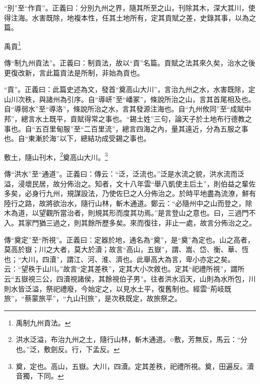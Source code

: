 {\noindent\shu{}\fzkt “別”至“作貢”。正義曰：分別九州之界，隨其所至之山，刊除其木，深大其川，使得注海。水害既除，地複本性，任其土地所有，定其貢賦之差，史錄其事，以為之篇。 \par}

禹貢\footnote{禹制九州貢法。}

{\noindent\zhuan{}\fzbyks 傳“制九州貢法”。正義曰：制貢法，故以“貢”名篇。貢賦之法其來久矣，治水之後更復改新，言此篇貢法是所制，非始為貢也。 \par}

{\noindent\shu{}\fzkt “貢”。正義曰：此篇史述為文，發首“奠高山大川”，言治九州之水，水害既除，定山川次秩，與諸州為引序。自“導岍”至“嶓冢”，條說所治之山，言其首尾相及也。自“導弱水”至“導洛”，條說所治之水，言其發源注海也。自“九州攸同”至“成賦中邦”，總言水土既平，貢賦得常之事也。“錫土姓”三句，論天子於土地布行德教之事也。自“五百里甸服”至“二百里流”，總言四海之內，量其遠近，分為五服之事也。自“東漸於海”以下，總結功成受錫之事也。 \par}

敷土，隨山刊木，\footnote{洪水泛溢，布治九州之土，隨行山林，斬木通道。○敷，芳無反，馬云：“分也。”泛，敷劍反。行，下孟反。}奠高山大川。\footnote{奠，定也。高山，五嶽。大川，四瀆。定其差秩，祀禮所視。奠，田遍反。瀆音獨，下同。}

{\noindent\zhuan{}\fzbyks 傳“洪水”至“通道”。正義曰：傳云：“泛，泛流也。”泛是水流之貌，洪水流而泛溢，浸壞民居，故分佈治之。知者，文十八年雲“舉八凱使主后土”，則伯益之輩佐多矣，必身行九州，規謀設法，乃使佐巳之人分佈治之。於時平地盡為流潦，鮮有陸行之路，故將欲治水，隨行山林，斬木通道。鄭云：“必隨州中之山而登之，除木為道，以望觀所當治者，則規其形而度其功焉。”是言登山之意也。曰，三過門不入。其家門猶三過之，則其餘所歷多矣。來而復往，非止一處，故言分佈治之之。 \par}

{\noindent\zhuan{}\fzbyks 傳“奠定”至“所視”。正義曰：定器於地，通名為“奠”，是“奠”為定也。山之高者，莫高於嶽；川之大者，莫大於瀆；故言“高山，五嶽”，謂、嵩、岱、衡、華、恆也；“大川，四瀆”，謂江、河、淮、濟也。此舉高大為言，卑小亦定之矣。云：“望秩于山川。”故言“定其差秩”，定其大小次敘也。定其“祀禮所視”，謂所云“五嶽視三公，四瀆視諸侯，其餘視伯子男”。往者洪水滔天，山則為水所包，川則水皆泛溢，祭祀禮廢，今始定之，以見水土平，復舊制也。經雲“荊岐既旅”，“蔡蒙旅平”，“九山刊旅”，是次秩既定，故旅祭之。 \par}

